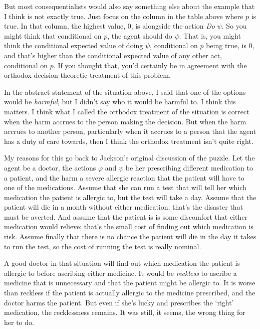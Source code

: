 \documentclass[11pt,oneside]{book}
\begin{document}
But most consequentialists would also say something else about the example that I think is not exactly true. Just focus on the column in the table above where $p$ is true. In that column, the highest value, 0, is alongside the action \textit{Do} $\psi$. So you might think that conditional on $p$, the agent should do $\psi$. That is, you might think the conditional expected value of doing $\psi$, conditional on $p$ being true, is 0, and that's higher than the conditional expected value of any other act, conditional on $p$. If you thought that, you'd certainly be in agreement with the orthodox decision-theoretic treatment of this problem.

In the abstract statement of the situation above, I said that one of the options would be \textit{harmful}, but I didn't say who it would be harmful to. I think this matters. I think what I called the orthodox treatment of the situation is correct when the harm accrues to the person making the decision. But when the harm accrues to another person, particularly when it accrues to a person that the agent has a duty of care towards, then I think the orthodox treatment isn't quite right.

My reasons for this go back to Jackson's original discussion of the puzzle. Let the agent be a doctor, the actions $\varphi$ and $\psi$ be her prescribing different medication to a patient, and the harm a severe allergic reaction that the patient will have to one of the medications. Assume that she can run a test that will tell her which medication the patient is allergic to, but the test will take a day. Assume that the patient will die in a month without either medication; that's the disaster that must be averted. And assume that the patient is is some discomfort that either medication would relieve; that's the small cost of finding out which medication is risk. Assume finally that there is no chance the patient will die in the day it takes to run the test, so the cost of running the test is really nominal.

A good doctor in that situation will find out which medication the patient is allergic to before ascribing either medicine. It would be \textit{reckless} to ascribe a medicine that is unnecessary and that the patient might be allergic to. It is worse than reckless if the patient is actually allergic to the medicine prescribed, and the doctor harms the patient. But even if she's lucky and prescribes the `right' medication, the recklessness remains. It was still, it seems, the wrong thing for her to do.
\end{document}
